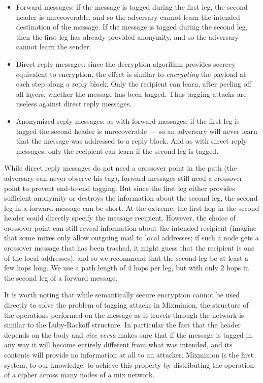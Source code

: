 \documentclass[final]{ieee}
\begin{document}
\begin{itemize}
\item Forward messages: if the message is tagged during the first leg,
the second header is unrecoverable, and so the adversary cannot
learn the intended destination of the message. If the message is tagged
during the second leg, then the first leg has already provided anonymity,
and so the adversary cannot learn the sender.
\item Direct reply messages: since the decryption algorithm provides
secrecy equivalent to encryption, the effect is similar to {\em encrypting}
the payload at each step along a reply block. Only the recipient can learn,
after peeling off all layers, whether the message has been tagged. Thus
tagging attacks are useless against direct reply messages.
\item Anonymized reply messages: as with forward messages, if the first leg
is tagged the second header is unrecoverable --- so an adversary will
never learn that the message was addressed to a reply block. And as with
direct reply messages, only the recipient can learn if the second leg is
tagged.
\end{itemize}

While direct reply messages do not need a crossover point in the path
(the adversary can never observe his tag), forward messages still need a
crossover point to prevent end-to-end tagging. But since the first leg
either provides sufficient anonymity or destroys the information about
the second leg, the second leg in a forward message can be short.
At the extreme, the first hop in the second header could directly
specify the message recipient. However, the choice of crossover point
can still reveal information about the intended recipient (imagine that
some mixes only allow outgoing mail to local addresses; if such a
node gets a crossover message that has been trashed, it might guess
that the recipient is one of the local addresses), and so we recommend
that the second leg be at least a few hops long.
We use a path length of 4 hops per leg, but with only 2 hops in the
second leg of a forward message.

It is worth noting that while semantically secure encryption cannot be
used directly to solve the problem of tagging attacks in Mixminion, the
structure of the operations performed on the message as it travels
through the network is similar to the Luby-Rackoff \cite{sprp}
structure. In particular the fact that the header depends on the body
and \emph{vice versa} makes sure that if the message is tagged in
any way it will become entirely different from what was intended, and
its contents
will provide no information at all to an attacker. Mixminion is the
first system, to our knowledge, to achieve this property by
distributing the operation of a cipher across many nodes of a mix network.
\end{document}
